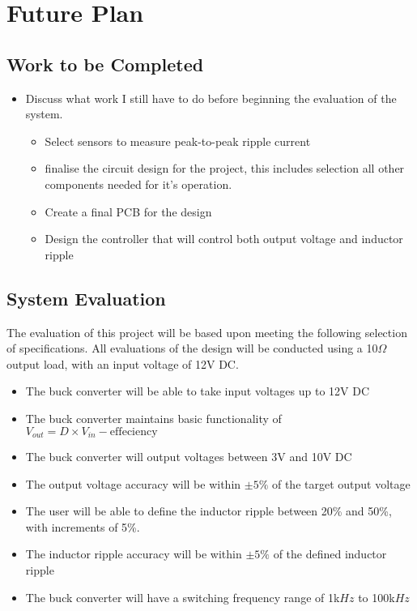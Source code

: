 \chapter{Future Plan}\label{C:future} 

\section{Work to be Completed}

\begin{itemize}

    \item 
    Discuss what work I still have to do before beginning the evaluation of the system. 

    \begin{itemize}
        \item Select sensors to measure peak-to-peak ripple current
        \item finalise the circuit design for the project, this includes selection all other components needed for it's operation.
        \item Create a final PCB for the design 
        \item Design the controller that will control both output voltage and inductor ripple 
    \end{itemize}

\end{itemize}

\section{System Evaluation}


    The evaluation of this project will be based upon meeting the following selection of specifications. All evaluations of the design will be conducted using a 10$\Omega$ output load, with an input voltage of 12V DC.

\begin{itemize}
	\item The buck converter will be able to take input voltages up to 12V DC
	
	\item The buck converter maintains basic functionality of $V_{out} = D\times V_{in} - \mathrm{effeciency}$

	\item The buck converter will output voltages between 3V and 10V DC
	
	\item The output voltage accuracy will be within $\pm 5\%$ of the target output voltage

	\item The user will be able to define the inductor ripple between 20\% and 50\%, with increments of 5\%.
	
	\item The inductor ripple accuracy will be within $\pm 5\%$ of the defined inductor ripple
	
	\item The buck converter will have a switching frequency range of 1k$Hz$ to 100k$Hz$

\end{itemize}

